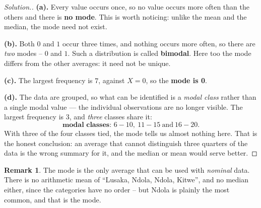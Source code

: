 \documentclass[11pt,a4paper]{article}
\theoremstyle{definition}
\newtheorem{remark}[thm]{Remark}
\newenvironment{solution}
  {\renewcommand{\qedsymbol}{}\begin{proof}[\textit{Solution}.]}
  {\end{proof}}
\begin{document}
\begin{solution}
\textbf{(a).} Every value occurs once, so no value occurs more often than the others and
there is \textbf{no mode}. This is worth noticing: unlike the mean and the median, the mode
need not exist.

\textbf{(b).} Both $0$ and $1$ occur three times, and nothing occurs more often, so there
are \emph{two} modes -- $0$ and $1$. Such a distribution is called \textbf{bimodal}. Here
too the mode differs from the other averages: it need not be unique.

\textbf{(c).} The largest frequency is $7$, against $X=0$, so the \textbf{mode is 0}.

\textbf{(d).} The data are grouped, so what can be identified is a \emph{modal class} rather
than a single modal value --- the individual observations are no longer visible. The largest
frequency is $3$, and \emph{three} classes share it:
\[\textbf{modal classes: } 6-10,\ 11-15\ \text{and}\ 16-20.\]
With three of the four classes tied, the mode tells us almost nothing here. That is the
honest conclusion: an average that cannot distinguish three quarters of the data is the wrong
summary for it, and the median or mean would serve better.
\end{solution}

\begin{remark}
The mode is the only average that can be used with \emph{nominal} data. There is no
arithmetic mean of ``Lusaka, Ndola, Ndola, Kitwe'', and no median either, since the
categories have no order -- but Ndola is plainly the most common, and that is the mode.
\end{remark}


\vspace{0.5cm}
\end{document}
